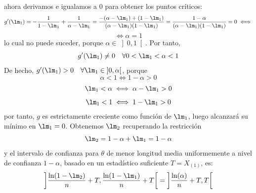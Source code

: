 \documentclass[12pt]{article}
\begin{document}
\begin{ejercicio}[2,25 puntos]
\begin{enumerate}
            ahora derivamos e igualamos a $0$ para obtener los puntos críticos:
            $$g'(\lm_1) = - \dfrac{1}{1-\lm_1} + \dfrac{1}{\alpha - \lm_1} = \dfrac{-(\alpha - \lm_1) + (1 - \lm_1)}{(\alpha - \lm_1)(1 - \lm_1)} = \dfrac{1 - \alpha}{(\alpha - \lm_1)(1 - \lm_1)} = 0 \iff$$
            $$\iff \alpha = 1$$
            lo cual no puede suceder, porque $\alpha \in \left]0,1 \right[$. Por tanto, $$g'(\lm_1) \neq 0 \quad \forall 0 < \lm_1 < \alpha < 1$$
            De hecho, $g'(\lm_1) > 0 \quad \forall \lm_1 \in \left]0,\alpha \right[$, porque
            $$\alpha < 1 \iff 1 - \alpha > 0$$
            $$\lm_1 < \alpha \iff \alpha - \lm_1 > 0$$
            $$\lm_1 < 1 \iff 1 - \lm_1 > 0$$
            por tanto, $g$ es estrictamente creciente como función de $\lm_1$, luego alcanzará su mínimo en $\lm_1 = 0$. Obtenemos $\lm_2$ recuperando la restricción
            $$\lm_2 = 1 - \alpha + \lm_1 = 1 - \alpha$$
            y el intervalo de confianza para $\theta$ de menor longitud media uniformemente a nivel de confianza $1-\alpha$, basado en un estadístico suficiente $T = X_{(1)}$, es:
            \begin{equation*}
                \left] \dfrac{\ln(1-\lm_2)}{n} + T, \dfrac{\ln(1-\lm_1)}{n} + T \right[ = \left] \dfrac{\ln(\alpha)}{n} + T, T \right[
            \end{equation*}
        \end{enumerate}
    \end{ejercicio}

    \newpage
\end{document}
